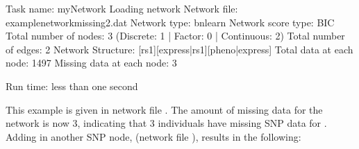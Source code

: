 \documentclass[letterpaper,10pt,english]{sphinxmanual}
\begin{document}
\begin{sphinxVerbatim}[commandchars=\\\{\}]
Task name: myNetwork
Loading network
Network file: example\PYGZhy{}network\PYGZhy{}missing2.dat
Network type: bnlearn
Network score type: BIC
Total number of nodes: 3 (Discrete: 1 | Factor: 0 | Continuous: 2)
Total number of edges: 2
Network Structure: [rs1][express|rs1][pheno|express]
Total data at each node: 1497
Missing data at each node: 3
\PYGZhy{}\PYGZhy{}\PYGZhy{}\PYGZhy{}\PYGZhy{}\PYGZhy{}\PYGZhy{}\PYGZhy{}\PYGZhy{}\PYGZhy{}\PYGZhy{}\PYGZhy{}\PYGZhy{}\PYGZhy{}\PYGZhy{}\PYGZhy{}\PYGZhy{}\PYGZhy{}\PYGZhy{}\PYGZhy{}\PYGZhy{}\PYGZhy{}\PYGZhy{}\PYGZhy{}\PYGZhy{}\PYGZhy{}\PYGZhy{}\PYGZhy{}\PYGZhy{}\PYGZhy{}\PYGZhy{}\PYGZhy{}\PYGZhy{}\PYGZhy{}\PYGZhy{}\PYGZhy{}\PYGZhy{}\PYGZhy{}\PYGZhy{}\PYGZhy{}\PYGZhy{}\PYGZhy{}\PYGZhy{}\PYGZhy{}\PYGZhy{}\PYGZhy{}\PYGZhy{}\PYGZhy{}\PYGZhy{}\PYGZhy{}

Run time: less than one second
\end{sphinxVerbatim}

\sphinxAtStartPar
This example is given in network file .
The amount of missing data for the network is now 3, indicating that 3 individuals have missing SNP data for .
Adding in another SNP node,  (network file ), results in the following:
\end{document}
